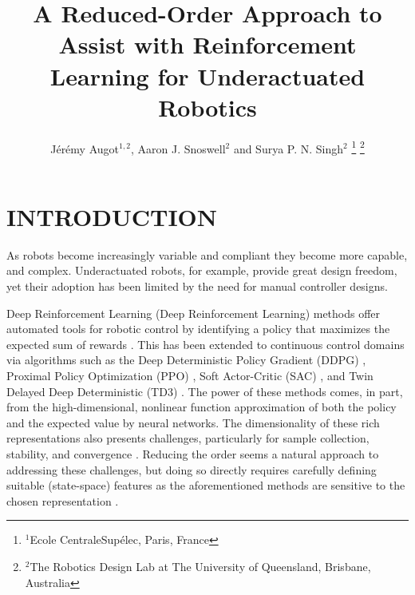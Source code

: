 \documentclass[letterpaper, 10 pt, conference]{ieeeconf}
\title{
    \LARGE \bf%
    A Reduced-Order Approach to Assist with Reinforcement Learning for Underactuated Robotics
}
\author{
    J\'er\'emy Augot$^{1,2}$, Aaron J. Snoswell$^{2}$ and Surya P. N. Singh$^{2}$
    \thanks{
        $^{1}$Ecole CentraleSup\'elec, Paris, France
    }%
    \thanks{
        $^{2}$The Robotics Design Lab at The University of Queensland, Brisbane, Australia
    }%
}
\begin{document}
\maketitle
\thispagestyle{empty}
\pagestyle{empty}

\begin{abstract}

\lipsum[1]

\end{abstract}

\section{INTRODUCTION}

As robots become increasingly variable and compliant they become more capable, and complex.
Underactuated robots, for example, provide great design freedom, yet their adoption has been limited by the need for manual controller designs.

Deep Reinforcement Learning (Deep Reinforcement Learning) methods offer automated tools for robotic control by identifying a policy that maximizes the expected sum of rewards \cite{henderson2018deep}.
This has been extended to continuous control domains via algorithms such as the Deep Deterministic Policy Gradient (DDPG) \cite{DDPG}, Proximal Policy Optimization (PPO) \cite{PPO}, Soft Actor-Critic (SAC) \cite{SAC}, and Twin Delayed Deep Deterministic (TD3) \cite{TD3}.
The power of these methods comes, in part, from the high-dimensional, nonlinear function approximation of both the policy and the expected value by neural networks.
The dimensionality of these rich representations also presents challenges, particularly for sample collection, stability, and convergence \cite{Islam2017}.
Reducing the order seems a natural approach to addressing these challenges, but doing so directly requires carefully defining suitable (state-space) features as the aforementioned methods are sensitive to the chosen representation \cite{bhatnagar2009convergent}. 
\end{document}
